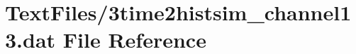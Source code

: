 \hypertarget{3time2histsim__channel13_8dat}{}\section{Text\+Files/3time2histsim\+\_\+channel13.dat File Reference}
\label{3time2histsim__channel13_8dat}
